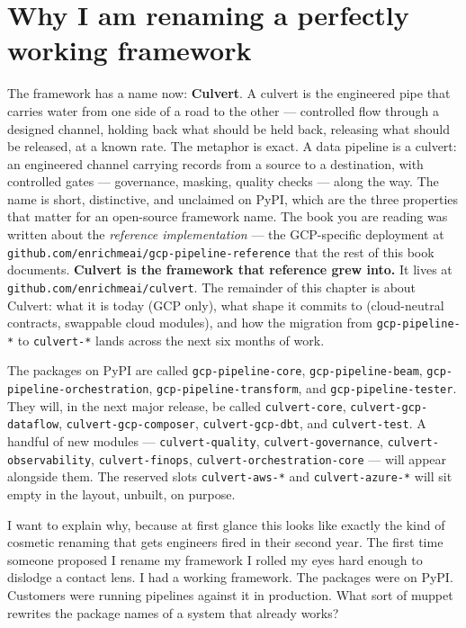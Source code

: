 \documentclass[
  11pt,
  british,
  oneside]{book}
\begin{document}
\hypertarget{why-i-am-renaming-a-perfectly-working-framework}{%
\section{Why I am renaming a perfectly working
framework}\label{why-i-am-renaming-a-perfectly-working-framework}}

The framework has a name now: \textbf{Culvert}. A culvert
is the engineered pipe that carries water from one side of a road to the
other --- controlled flow through a designed channel, holding back what
should be held back, releasing what should be released, at a known rate.
The metaphor is exact. A data pipeline is a culvert: an engineered
channel carrying records from a source to a destination, with controlled
gates --- governance, masking, quality checks --- along the way. The
name is short, distinctive, and unclaimed on PyPI, which are the three
properties that matter for an open-source framework name. The book you
are reading was written about the \emph{reference implementation} ---
the GCP-specific deployment at
\texttt{github.com/enrichmeai/gcp-pipeline-reference}
that the rest of this book documents. \textbf{Culvert is the framework
that reference grew into.} It lives at
\texttt{github.com/enrichmeai/culvert}. The
remainder of this chapter is about Culvert: what it is today (GCP only),
what shape it commits to (cloud-neutral contracts, swappable cloud
modules), and how the migration from \texttt{gcp-pipeline-*} to
\texttt{culvert-*} lands across the next six months of work.

The packages on PyPI are called \texttt{gcp-pipeline-core},
\texttt{gcp-pipeline-beam}, \texttt{gcp-pipeline-orchestration},
\texttt{gcp-pipeline-transform}, and \texttt{gcp-pipeline-tester}. They
will, in the next major release, be called
\texttt{culvert-core},
\texttt{culvert-gcp-dataflow},
\texttt{culvert-gcp-composer},
\texttt{culvert-gcp-dbt}, and
\texttt{culvert-test}. A handful of new modules ---
\texttt{culvert-quality}, \texttt{culvert-governance},
\texttt{culvert-observability}, \texttt{culvert-finops},
\texttt{culvert-orchestration-core} --- will appear alongside them. The
reserved slots \texttt{culvert-aws-*} and \texttt{culvert-azure-*} will
sit empty in the layout, unbuilt, on purpose.

I want to explain why, because at first glance this looks like exactly
the kind of cosmetic renaming that gets engineers fired in their second
year. The first time someone proposed I rename my framework I rolled my
eyes hard enough to dislodge a contact lens. I had a working framework.
The packages were on PyPI. Customers were running pipelines against it
in production. What sort of muppet rewrites the package names of a
system that already works?
\end{document}
